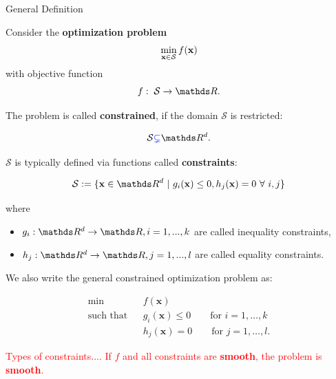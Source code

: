 \begin{vbframe}{General Definition}

Consider the \textbf{optimization problem}
$$
\min_{\mathbf{x} \in \mathcal{S}} f(\mathbf{x})
$$
with objective function
$$
f: \; \mathcal{S} \to \R.
$$

The problem is called \textbf{constrained}, if the domain $\mathcal{S}$ is restricted: 

$$
	\mathcal{S} \textcolor{blue}{\subsetneq} \R^d.
$$

$\mathcal{S}$ is typically defined via functions called \textbf{constraints}: 

$$
	\mathcal{S}:= \{\xv \in \R^d ~|~ g_i(\xv) \le 0, h_j(\xv) = 0 ~\forall~ i, j\}
$$ 

where

\begin{itemize}
\item $g_i: \R^d \to \R, i = 1, ..., k$ are called inequality constraints,
\item $h_j: \R^d \to \R, j = 1, ..., l$ are called equality constraints.
\end{itemize}

\framebreak 

We also write the general constrained optimization problem as: 

\begin{eqnarray*}
\min && f(\mathbf{x})  \\
\text{such that} && g_i(\mathbf{x}) \le 0 \qquad \text{for } i=1,\ldots,k  \\
 && h_j(\mathbf{x}) = 0 \qquad \text{for } j=1,\ldots,l. 
\end{eqnarray*}

\textcolor{red}{Types of constraints.... If $f$ and all constraints are \textbf{smooth}, the problem is \textbf{smooth}.}





\end{vbframe}

